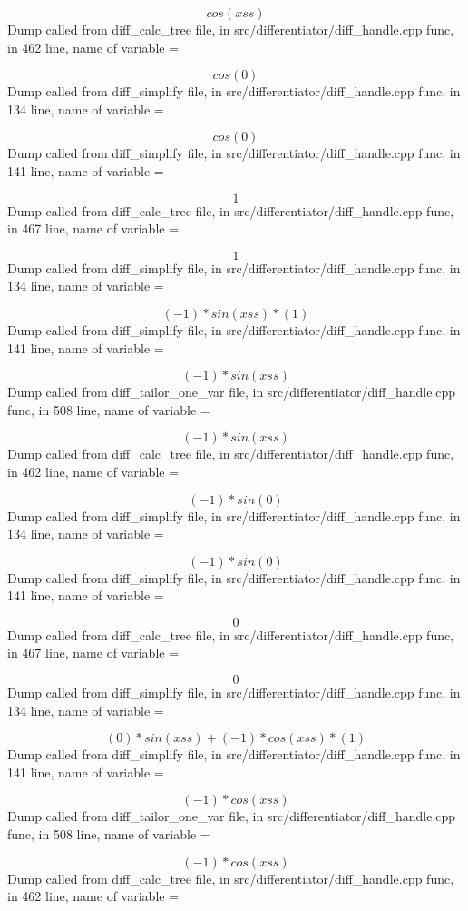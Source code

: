 \documentclass{article}
\begin{document}
$$
 cos (xss)
$$
Dump called from diff_calc_tree file, in src/differentiator/diff_handle.cpp func, in 462 line, name of variable = 


$$
 cos (0)
$$
Dump called from diff_simplify file, in src/differentiator/diff_handle.cpp func, in 134 line, name of variable = 


$$
 cos (0)
$$
Dump called from diff_simplify file, in src/differentiator/diff_handle.cpp func, in 141 line, name of variable = 


$$
1
$$
Dump called from diff_calc_tree file, in src/differentiator/diff_handle.cpp func, in 467 line, name of variable = 


$$
1
$$
Dump called from diff_simplify file, in src/differentiator/diff_handle.cpp func, in 134 line, name of variable = 


$$
(-1) *  sin (xss) * (1)
$$
Dump called from diff_simplify file, in src/differentiator/diff_handle.cpp func, in 141 line, name of variable = 


$$
(-1) *  sin (xss)
$$
Dump called from diff_tailor_one_var file, in src/differentiator/diff_handle.cpp func, in 508 line, name of variable = 


$$
(-1) *  sin (xss)
$$
Dump called from diff_calc_tree file, in src/differentiator/diff_handle.cpp func, in 462 line, name of variable = 


$$
(-1) *  sin (0)
$$
Dump called from diff_simplify file, in src/differentiator/diff_handle.cpp func, in 134 line, name of variable = 


$$
(-1) *  sin (0)
$$
Dump called from diff_simplify file, in src/differentiator/diff_handle.cpp func, in 141 line, name of variable = 


$$
0
$$
Dump called from diff_calc_tree file, in src/differentiator/diff_handle.cpp func, in 467 line, name of variable = 


$$
0
$$
Dump called from diff_simplify file, in src/differentiator/diff_handle.cpp func, in 134 line, name of variable = 


$$
(0) *  sin (xss) + (-1) *  cos (xss) * (1)
$$
Dump called from diff_simplify file, in src/differentiator/diff_handle.cpp func, in 141 line, name of variable = 


$$
(-1) *  cos (xss)
$$
Dump called from diff_tailor_one_var file, in src/differentiator/diff_handle.cpp func, in 508 line, name of variable = 


$$
(-1) *  cos (xss)
$$
Dump called from diff_calc_tree file, in src/differentiator/diff_handle.cpp func, in 462 line, name of variable = 
\end{document}
